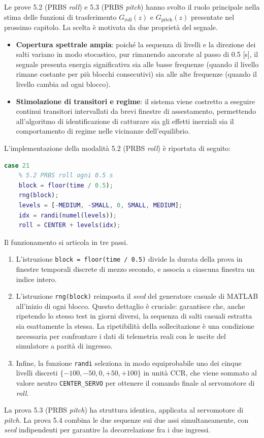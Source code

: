 \documentclass[11pt]{report}
\begin{document}
	Le prove 5.2 (PRBS \textit{roll}) e 5.3 (PRBS \textit{pitch}) hanno svolto il ruolo principale nella stima delle funzioni di trasferimento $G_\text{roll}(z)$ e $G_\text{pitch}(z)$ presentate nel prossimo capitolo. La scelta è motivata da due proprietà del segnale.
	\begin{itemize}
		\item \textbf{Copertura spettrale ampia}: poiché la sequenza di livelli e la direzione dei salti variano in modo stocastico, pur rimanendo ancorate al passo di 0.5 [s], il segnale presenta energia significativa sia alle basse frequenze (quando il livello rimane costante per più blocchi consecutivi) sia alle alte frequenze (quando il livello cambia ad ogni blocco).
		\item \textbf{Stimolazione di transitori e regime}: il sistema viene costretto a eseguire continui transitori intervallati da brevi finestre di assestamento, permettendo all'algoritmo di identificazione di catturare sia gli effetti inerziali sia il comportamento di regime nelle vicinanze dell'equilibrio.
	\end{itemize}
	L'implementazione della modalità 5.2 (PRBS \textit{roll}) è riportata di seguito:
	
	\begin{lstlisting}[language=Matlab, caption={Generazione della sequenza pseudo-casuale multilivello sul flap di roll (case 21)}]
case 21
    % 5.2 PRBS roll ogni 0.5 s
    block = floor(time / 0.5);
    rng(block);
    levels = [-MEDIUM, -SMALL, 0, SMALL, MEDIUM];
    idx = randi(numel(levels));
    roll = CENTER + levels(idx);
	\end{lstlisting}
	
	Il funzionamento si articola in tre passi.
	\begin{enumerate}
		\item L'istruzione \texttt{block = floor(time / 0.5)} divide la durata della prova in finestre temporali discrete di mezzo secondo, e associa a ciascuna finestra un indice intero.
		\item L'istruzione \texttt{rng(block)} reimposta il \textit{seed} del generatore casuale di MATLAB all'inizio di ogni blocco. Questo dettaglio è cruciale: garantisce che, anche ripetendo lo stesso test in giorni diversi, la sequenza di salti casuali estratta sia esattamente la stessa. La ripetibilità della sollecitazione è una condizione necessaria per confrontare i dati di telemetria reali con le uscite del simulatore a parità di ingresso.
		\item Infine, la funzione \texttt{randi} seleziona in modo equiprobabile uno dei cinque livelli discreti $\{-100, -50, 0, +50, +100\}$ in unità CCR, che viene sommato al valore neutro \texttt{CENTER\_SERVO} per ottenere il comando finale al servomotore di \textit{roll}.
	\end{enumerate}
	La prova 5.3 (PRBS \textit{pitch}) ha struttura identica, applicata al servomotore di \textit{pitch}. La prova 5.4 combina le due sequenze sui due assi simultaneamente, con \textit{seed} indipendenti per garantire la decorrelazione fra i due ingressi.
	
\end{document}
